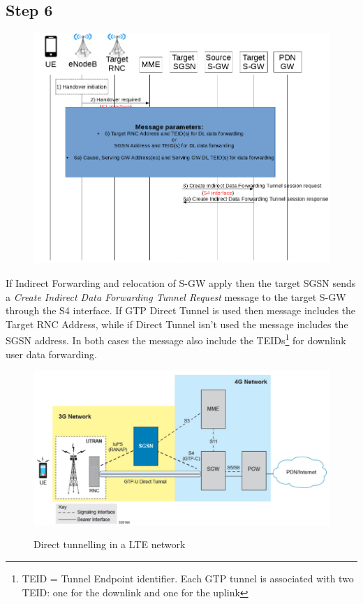 \subsection*{Step 6}
\begin{figure}[!htb]
	\centering
	\includegraphics[width=0.9\linewidth]{img/6.png}
	\label{fig:6}
\end{figure}
If Indirect Forwarding and relocation of S-GW apply then the
target SGSN sends a \emph{Create Indirect Data Forwarding Tunnel Request}
message to the target S-GW through the S4 interface. If GTP Direct Tunnel is used
then message includes the Target RNC Address, while if Direct Tunnel isn't
used the message includes the SGSN address. In both cases the message also
include the TEIDs\footnote{TEID = Tunnel Endpoint identifier. Each GTP tunnel
is associated with two TEID: one for the downlink and one for the uplink}
for downlink user data forwarding.
\begin{figure}[!htb]
	\centering
	\includegraphics[width=1\linewidth]{img/direct-tunnelling.png}
	\label{fig:direct-tunnelling}
	\caption{Direct tunnelling in a LTE network \protect\cite{direct-tunnelling}}
\end{figure}


